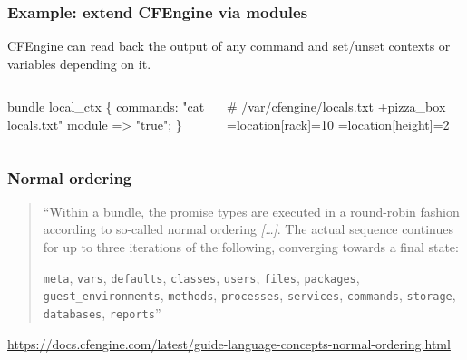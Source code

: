 \documentclass[english,serif,mathserif,usenames,dvipsnames]{beamer}
\begin{document}
\begin{frame}[fragile]
  \frametitle{Example: extend CFEngine via modules}
  CFEngine can read back the output of any command and set/unset
  contexts or variables depending on it.
  \begin{columns}
    \begin{column}{0.5\linewidth}
\begin{semiverbatim}\small
bundle local_ctx \{
  commands:
    "cat locals.txt"
    \alert<1>{module => "true";}
\}
\end{semiverbatim}
    \end{column}
    \begin{column}{0.5\linewidth}
\begin{semiverbatim}\small
\alert<4>{# /var/cfengine/locals.txt}
\alert<2>{+pizza_box}
\alert<3>{=location[rack]=10}
\alert<3>{=location[height]=2}
\end{semiverbatim}
    \end{column}
  \end{columns}

  \+
\end{frame}


\begin{frame}[fragile]
  \frametitle{Normal ordering}

  \begin{quote}
    ``\alert<1>{Within a bundle, the promise types are executed in a
      round-robin fashion according to so-called normal ordering}
    \emph{[\ldots]}. \alert<2>{The actual sequence continues for up to
      three iterations of the following}, converging towards a final
    state:

    \texttt{meta},
    \texttt{vars},
    \texttt{defaults},
    \texttt{classes},
    \texttt{users},
    \texttt{files},
    \texttt{packages},
    \texttt{guest\_environments},
    \texttt{methods},
    \texttt{processes},
    \texttt{services},
    \texttt{commands},
    \texttt{storage},
    \texttt{databases},
    \texttt{reports}''
  \end{quote}


  \begin{references}
    \url{https://docs.cfengine.com/latest/guide-language-concepts-normal-ordering.html}
  \end{references}
\end{frame}
\end{document}
